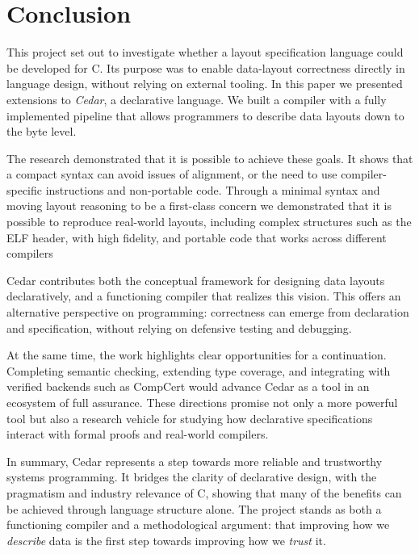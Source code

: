 \section{Conclusion}
This project set out to investigate whether a layout specification
language could be developed for C. Its purpose was to
enable data-layout correctness directly in language design, without
relying on external tooling. In this paper we presented extensions
to \textit{Cedar}, a declarative language. We built a
compiler with a fully implemented pipeline that allows
programmers to describe data layouts down to the byte level.

The research demonstrated that it is possible to achieve these goals.
It shows that a compact syntax can avoid issues of alignment,
or the need to use compiler-specific instructions and non-portable code.
Through a minimal syntax and moving layout reasoning to be a first-class concern
we demonstrated that it is possible to reproduce real-world layouts, including
complex structures such as the ELF header, with high fidelity, and 
portable code that works across different compilers

Cedar contributes both the conceptual framework for designing
data layouts declaratively, and a functioning compiler
that realizes this vision. This offers an alternative perspective
on programming: correctness can emerge from declaration and
specification, without relying on defensive testing and debugging. 

At the same time, the work highlights clear opportunities for a continuation.
Completing semantic checking, extending type coverage, and integrating
with verified backends such as CompCert would advance Cedar as a tool
in an ecosystem of full assurance. These directions promise not only a
more powerful tool but also a research vehicle for studying how
declarative specifications interact with formal proofs and real-world
compilers.

In summary, Cedar represents a step towards more reliable and trustworthy
systems programming. It bridges the clarity of declarative design, with the
pragmatism and industry relevance of C, showing that many of the
benefits can be achieved through language structure alone. The
project stands as both a functioning compiler and a methodological argument:
that improving how we \textit{describe} data is the first step
towards improving how we \textit{trust} it.